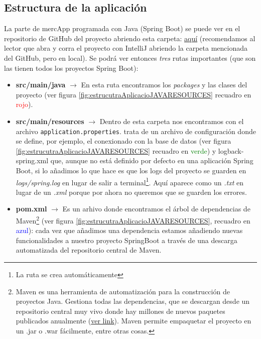 \documentclass[a4paper,12pt]{report}
\begin{document}
				\subsection{Estructura de la aplicación}
				\label{sec:estructuraAplicacion}
				
				La parte de mercApp programada con Java (Spring Boot) se puede ver en el repositorio de GitHub del proyecto abriendo esta carpeta: \href{https://github.com/blackcub3s/mercApp/tree/main/APP%20WEB/__springboot__produccio__/app}{aquí} (recomendamos al lector que abra y corra el proyecto con IntelliJ abriendo la carpeta mencionada del GitHub, pero en local). Se podrá ver entonces \textit{tres} rutas importantes (que son las tienen todos los proyectos Spring Boot):
				
				\vspace{-.9em}
				\begin{itemize}
					\setlength{\itemsep}{-.5em}
					\item \textbf{src/main/java} $\rightarrow$ En esta ruta encontramos los \textit{packages} y las clases del proyecto (ver figura \ref{fig:estrucutraAplicacioJAVARESOURCES} recuadro en \textcolor{red}{rojo}).
					\item \textbf{src/main/resources} $\rightarrow$ Dentro de esta carpeta  nos encontramos con el archivo \texttt{application.properties}. trata de un archivo de configuración donde se define, por ejemplo, el conexionado con la base de datos (ver figura \ref{fig:estrucutraAplicacioJAVARESOURCES} recuadro en \textcolor{green}{verde}) y logback-spring.xml que, aunque no está definido por defecto en una aplicación Spring Boot, si lo añadimos lo que hace es que los logs del proyecto se guarden en \textit{logs/spring.log} en lugar de salir a terminal\footnote{La ruta se crea automáticamente}. Aquí aparece como un \textit{.txt} en lugar de un \textit{.xml} porque por ahora no queremos que se guarden los errores.
					\item \textbf{pom.xml} $\rightarrow$ Es un arhivo donde encontramos el árbol de dependencias de Maven\footnote{Maven es una herramienta de automatización para la construcción de proyectos Java. Gestiona todas las dependencias, que se descargan desde un repositorio central muy vivo donde hay millones de nuevos paquetes publicados anualmente (\href{https://mvnrepository.com/repos/central}{ver link}). Maven permite empaquetar el proyecto en un .jar o .war fácilmente, entre otras cosas.} (ver figura \ref{fig:estrucutraAplicacioJAVARESOURCES}, recuadro en \textcolor{blue}{azul}): cada vez que añadimos una dependencia estamos añadiendo nuevas funcionalidades a nuestro proyecto SpringBoot a través de una descarga automatizada del repositorio central de Maven.
					
					
				\end{itemize}
				
\end{document}
